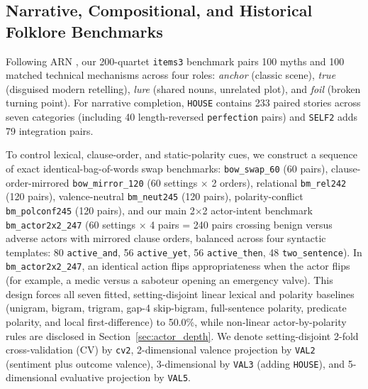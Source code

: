 \documentclass[conference]{IEEEtran}
\begin{document}
\subsection{Narrative, Compositional, and Historical Folklore Benchmarks}
Following ARN \cite{sourati2024arn}, our 200-quartet \texttt{items3} benchmark pairs 100 myths and 100 matched technical mechanisms across four roles: \textit{anchor} (classic scene), \textit{true} (disguised modern retelling), \textit{lure} (shared nouns, unrelated plot), and \textit{foil} (broken turning point). For narrative completion, \texttt{HOUSE} contains 233 paired stories across seven categories (including 40 length-reversed \texttt{perfection} pairs) and \texttt{SELF2} adds 79 integration pairs.

To control lexical, clause-order, and static-polarity cues, we construct a sequence of exact identical-bag-of-words swap benchmarks: \texttt{bow\_swap\_60} (60 pairs), clause-order-mirrored \texttt{bow\_mirror\_120} (60 settings $\times$ 2 orders), relational \texttt{bm\_rel242} (120 pairs), valence-neutral \texttt{bm\_neut245} (120 pairs), polarity-conflict \texttt{bm\_polconf245} (120 pairs), and our main 2$\times$2 actor-intent benchmark \texttt{bm\_actor2x2\_247} (60 settings $\times$ 4 pairs = 240 pairs crossing benign versus adverse actors with mirrored clause orders, balanced across four syntactic templates: 80 \texttt{active\_and}, 56 \texttt{active\_yet}, 56 \texttt{active\_then}, 48 \texttt{two\_sentence}). In \texttt{bm\_actor2x2\_247}, an identical action flips appropriateness when the actor flips (for example, a medic versus a saboteur opening an emergency valve). This design forces all seven fitted, setting-disjoint linear lexical and polarity baselines (unigram, bigram, trigram, gap-4 skip-bigram, full-sentence polarity, predicate polarity, and local first-difference) to 50.0\%, while non-linear actor-by-polarity rules are disclosed in Section~\ref{sec:actor_depth}. We denote setting-disjoint 2-fold cross-validation (CV) by \texttt{cv2}, 2-dimensional valence projection by \texttt{VAL2} (sentiment plus outcome valence), 3-dimensional by \texttt{VAL3} (adding \texttt{HOUSE}), and 5-dimensional evaluative projection by \texttt{VAL5}.
\end{document}
